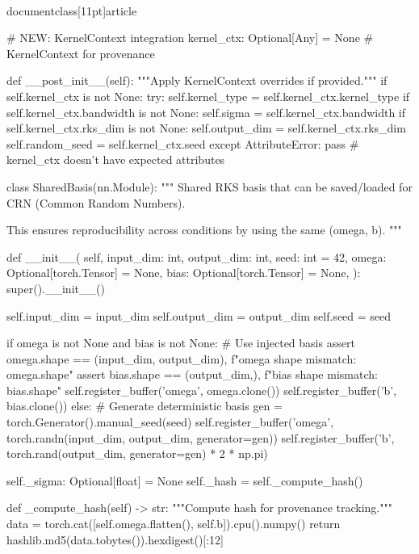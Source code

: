 \\documentclass[11pt]{article}
\begin{document}
\begin{CodeBlock}
    # NEW: KernelContext integration
    kernel_ctx: Optional[Any] = None  # KernelContext for provenance
    
    def __post_init__(self):
        """Apply KernelContext overrides if provided."""
        if self.kernel_ctx is not None:
            try:
                self.kernel_type = self.kernel_ctx.kernel_type
                if self.kernel_ctx.bandwidth is not None:
                    self.sigma = self.kernel_ctx.bandwidth
                if self.kernel_ctx.rks_dim is not None:
                    self.output_dim = self.kernel_ctx.rks_dim
                self.random_seed = self.kernel_ctx.seed
            except AttributeError:
                pass  # kernel_ctx doesn't have expected attributes


class SharedBasis(nn.Module):
    """
    Shared RKS basis that can be saved/loaded for CRN (Common Random Numbers).
    
    This ensures reproducibility across conditions by using the same (omega, b).
    """
    
    def __init__(
        self,
        input_dim: int,
        output_dim: int,
        seed: int = 42,
        omega: Optional[torch.Tensor] = None,
        bias: Optional[torch.Tensor] = None,
    ):
        super().__init__()
        
        self.input_dim = input_dim
        self.output_dim = output_dim
        self.seed = seed
        
        if omega is not None and bias is not None:
            # Use injected basis
            assert omega.shape == (input_dim, output_dim), f"omega shape mismatch: {omega.shape}"
            assert bias.shape == (output_dim,), f"bias shape mismatch: {bias.shape}"
            self.register_buffer('omega', omega.clone())
            self.register_buffer('b', bias.clone())
        else:
            # Generate deterministic basis
            gen = torch.Generator().manual_seed(seed)
            self.register_buffer('omega', torch.randn(input_dim, output_dim, generator=gen))
            self.register_buffer('b', torch.rand(output_dim, generator=gen) * 2 * np.pi)
        
        self._sigma: Optional[float] = None
        self._hash = self._compute_hash()
    
    def _compute_hash(self) -> str:
        """Compute hash for provenance tracking."""
        data = torch.cat([self.omega.flatten(), self.b]).cpu().numpy()
        return hashlib.md5(data.tobytes()).hexdigest()[:12]
    

\end{CodeBlock}
\end{document}
